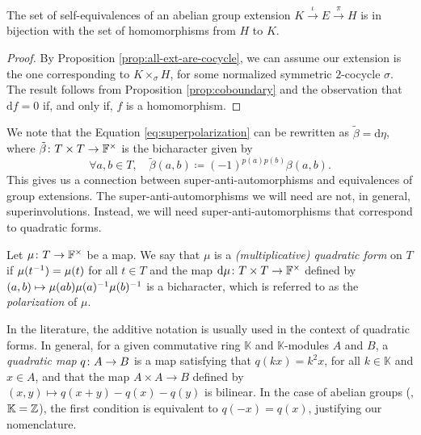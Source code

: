 \begin{cor}\label{cor:self-equivalences-are-homomorphisms}
    The set of self-equivalences of an abelian group extension $K \xrightarrow{\iota} E \xrightarrow{\pi} H$ is in bijection with the set of homomorphisms from $H$ to $K$.
\end{cor}

\begin{proof}
    By Proposition \ref{prop:all-ext-are-cocycle}, we can assume our extension is the one corresponding to $K \times_\sigma H$, for some normalized symmetric $2$-cocycle $\sigma$. 
    The result follows from Proposition \ref{prop:coboundary} and the observation that $\mathrm{d}f = 0$ if, and only if, $f$ is a homomorphism. 
\end{proof}

We note that the Equation \eqref{eq:superpolarization} can be rewritten as $\tilde\beta = \mathrm{d}\eta$, where $\tilde\beta\colon T\times T \to \mathbb{F}^\times$ is the bicharacter given by
\begin{equation}\label{eq:def-beta-tilde}
    \forall a,b\in T,\quad \tilde\beta(a,b) \coloneqq (-1)^{p(a)p(b)}\beta(a,b).
\end{equation}
This gives us a connection between super-anti-automorphisms and equivalences of group extensions. 
The super-anti-automorphisms we will need are not, in general, superinvolutions. 
Instead, we will need super-anti-automorphisms that correspond to quadratic forms.

\begin{defi}
    Let $\mu\colon T \to \mathbb{F}^\times$ be a map. 
    We say that $\mu$ is a \emph{(multiplicative) quadratic form} on $T$ if $\mu(t^{-1}) = \mu (t)$ for all $t\in T$ and the map $\mathrm{d}\mu\colon T\times T \to \mathbb{F}^\times$ defined by
    $(a,b) \mapsto \mu(ab) \mu(a)^{-1} \mu(b)^{-1}$
    is a bicharacter, which is referred to as the \emph{polarization} of $\mu$.
\end{defi}

\begin{remark}
    In the literature, the additive notation is usually used in the context of quadratic forms. 
    In general, for a given commutative ring $\mathbb K$ and $\mathbb K$-modules $A$ and $B$, a \emph{quadratic map} $q\colon A \to B$ is a map satisfying that $q(kx) = k^2 x$, for all $k\in \mathbb K$ and $x \in A$, and that the map $A \times A \to B$ defined by $(x,y) \mapsto q(x+y) - q(x) - q(y)$ is bilinear. 
    In the case of abelian groups (\ie, $\mathbb K = \mathbb{Z}$), the first condition is equivalent to $q(-x) = q(x)$, justifying our nomenclature.
\end{remark}

